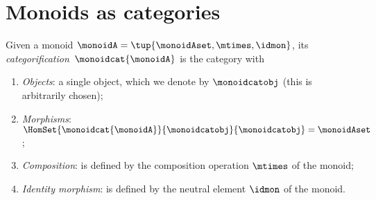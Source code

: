 
\section[Monoids as categories]{Monoids as categories}
\label{sec:monoids-as-cats}

\begin{ctdefinition}\label{def:monoidcat}
    Given a monoid $\monoidA = \tup{\monoidAset, \mtimes, \idmon}$, its \emph{categorification}~$\monoidcat{\monoidA}$ is the category with
    \begin{enumerate}
        \item \emph{Objects}: a single object, which we denote by $\monoidcatobj$ (this is arbitrarily chosen);
        \item \emph{Morphisms}: $\HomSet{\monoidcat{\monoidA}}{\monoidcatobj}{\monoidcatobj} = \monoidAset$;
        \item \emph{Composition}: is defined by the composition operation $\mtimes$ of the monoid;
        \item \emph{Identity morphism}: is defined by the neutral element $\idmon$ of the monoid.
    \end{enumerate}
\end{ctdefinition}

